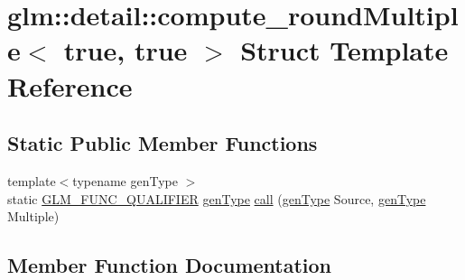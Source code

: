 \hypertarget{structglm_1_1detail_1_1compute__round_multiple_3_01true_00_01true_01_4}{}\section{glm\+:\+:detail\+:\+:compute\+\_\+round\+Multiple$<$ true, true $>$ Struct Template Reference}
\label{structglm_1_1detail_1_1compute__round_multiple_3_01true_00_01true_01_4}
\subsection*{Static Public Member Functions}
\begin{DoxyCompactItemize}
\item 
{\footnotesize template$<$typename gen\+Type $>$ }\\static \mbox{\hyperlink{setup_8hpp_a33fdea6f91c5f834105f7415e2a64407}{G\+L\+M\+\_\+\+F\+U\+N\+C\+\_\+\+Q\+U\+A\+L\+I\+F\+I\+ER}} \mbox{\hyperlink{structglm_1_1detail_1_1gen_type}{gen\+Type}} \mbox{\hyperlink{structglm_1_1detail_1_1compute__round_multiple_3_01true_00_01true_01_4_ad2ba30e3338e768e6119c957f44b2216}{call}} (\mbox{\hyperlink{structglm_1_1detail_1_1gen_type}{gen\+Type}} Source, \mbox{\hyperlink{structglm_1_1detail_1_1gen_type}{gen\+Type}} Multiple)
\end{DoxyCompactItemize}


\subsection{Member Function Documentation}
\mbox{\label{structglm_1_1detail_1_1compute__round_multiple_3_01true_00_01true_01_4_ad2ba30e3338e768e6119c957f44b2216}} 
